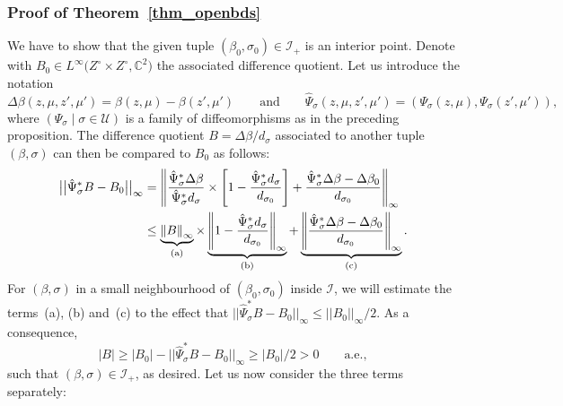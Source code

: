 \documentclass[pdftex]{sigma}
\numberwithin{equation}{section}
\theoremstyle{definition}
\newcommand{\C}{\mathbb{C}} %
\newcommand{\1}{{\bf 1}}
\begin{document}
\subsubsection*{Proof of Theorem~\ref{thm_openbds}}
We have to show that the given tuple $(\beta_0,\sigma_0)\in \mathcal I_+$ is an interior point. Denote with $B_0\in L^\infty\bigl(Z^\circ\times Z^\circ,\C^2\bigr)$ the associated difference quotient.
 Let us introduce the notation \[
 \Delta \beta(z,\mu,z',\mu')=\beta(z,\mu)-\beta(z',\mu')\qquad \text{and} \qquad \hat \Psi_\sigma(z,\mu,z',\mu')=(\Psi_\sigma(z,\mu),\Psi_\sigma(z',\mu')),\]
 where $(\Psi_\sigma\mid \sigma\in \mathcal U)$ is a family of diffeomorphisms as in the preceding proposition. The difference quotient $B=\Delta \beta/d_{\sigma}$ associated to another tuple $(\beta,\sigma)$ can then be compared to $B_0$ as follows:
\begin{align*}
\big|\big|\hat \Psi_\sigma^*B-B_0\big|\big|_\infty &= \left\Vert
\frac{\hat \Psi_\sigma^*\Delta \beta}{\hat \Psi_\sigma^*d_\sigma} \times \left[1- \frac{\hat \Psi_\sigma^*d_\sigma}{d_{\sigma_0}}\right] + \frac{\hat \Psi_\sigma^*\Delta \beta - \Delta \beta_0}{d_{\sigma_0}}
\right\Vert_\infty \\
&\le
\underbrace{\left
\Vert
B \right\Vert_\infty }_{\rm (a)}\times \underbrace{\left\Vert 1- \frac{\hat \Psi_\sigma^*d_\sigma}{d_{\sigma_0}} \right\Vert_\infty}_{\rm (b)} + \underbrace{ \left\Vert\frac{\hat \Psi_\sigma^*\Delta \beta - \Delta \beta_0}{d_{\sigma_0}} \right\Vert_\infty }_{\rm (c)}.
\end{align*}
For $(\beta,\sigma)$ in a small neighbourhood of $(\beta_0,\sigma_0)$ inside $\mathcal I$, we will estimate the terms~(a), (b) and~(c) to the effect that $\big|\big|\hat \Psi_\sigma^*B-B_0\big|\big|_\infty \le ||B_0||_\infty/2$. As a consequence,
\begin{equation*}
| B | \ge |B_0 | - \big|\big|\hat\Psi_\sigma^*B-B_0\big|\big|_\infty \ge |B_0|/2>0\qquad \text{a.e.},
\end{equation*}
such that $(\beta,\sigma)\in \mathcal I_+$, as desired. Let us now consider the three terms separately:
\end{document}
